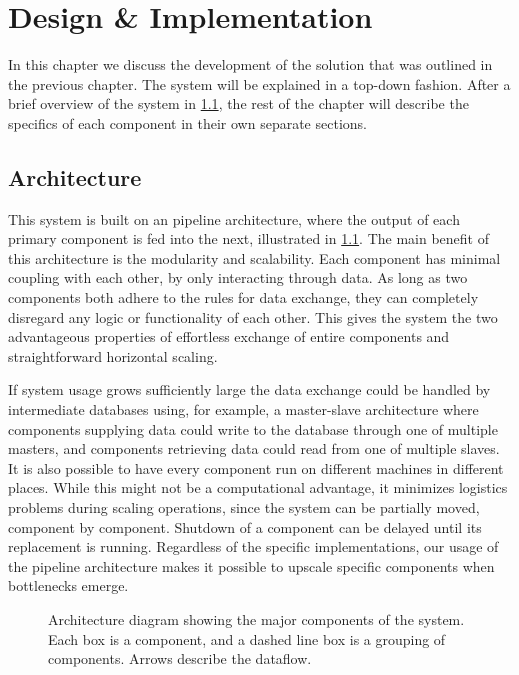 \chapter{Design \& Implementation}\label{chap:design}
In this chapter we discuss the development of the solution that was outlined in the previous chapter. The system will be explained in a top-down fashion. After a brief overview of the system in \cref{sec:design_overview}, the rest of the chapter will describe the specifics of each component in their own separate sections.

\section{Architecture}\label{sec:design_overview}
This system is built on an pipeline architecture, where the output of each primary component is fed into the next, illustrated in \cref{fig:system-overview}. The main benefit of this architecture is the modularity and scalability. Each component has minimal coupling with each other, by only interacting through data. As long as two components both adhere to the rules for data exchange, they can completely disregard any logic or functionality of each other. This gives the system the two advantageous properties of effortless exchange of entire components and straightforward horizontal scaling.

If system usage grows sufficiently large the data exchange could be handled by intermediate databases using, for example, a master-slave architecture where components supplying data could write to the database through one of multiple masters, and components retrieving data could read from one of multiple slaves. It is also possible to have every component run on different machines in different places. While this might not be a computational advantage, it minimizes logistics problems during scaling operations, since the system can be partially moved, component by component. Shutdown of a component can be delayed until its replacement is running. Regardless of the specific implementations, our usage of the pipeline architecture makes it possible to upscale specific components when bottlenecks emerge.

\begin{figure}[tb]%
  \centering
  
\caption[Architecture diagram showing the major components of the system]{Architecture diagram showing the major components of the system. Each box is a component, and a dashed line box is a grouping of components. Arrows describe the dataflow.}%
\label{fig:system-overview}%
\end{figure}

